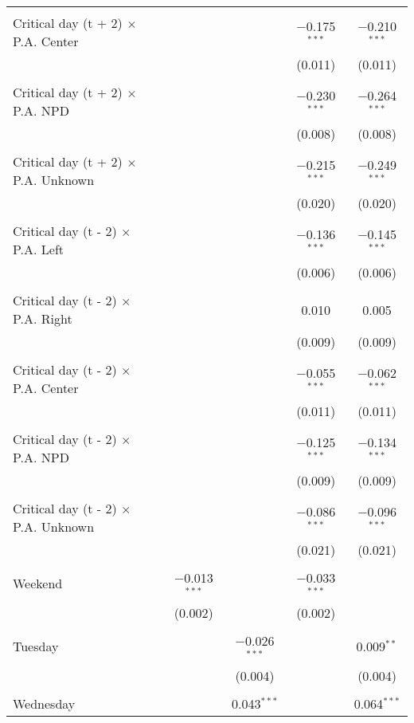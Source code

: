 \documentclass[
]{article}
\begin{document}
\begin{table}[!htbp]
{\begin{tabular}{@{\extracolsep{5pt}}lcccc}
  & & & & \\ 
 Critical day (t + 2) $\times$ P.A. Center &  &  & $-$0.175$^{***}$ & $-$0.210$^{***}$ \\ 
  &  &  & (0.011) & (0.011) \\ 
  & & & & \\ 
 Critical day (t + 2) $\times$ P.A. NPD &  &  & $-$0.230$^{***}$ & $-$0.264$^{***}$ \\ 
  &  &  & (0.008) & (0.008) \\ 
  & & & & \\ 
 Critical day (t + 2) $\times$ P.A. Unknown &  &  & $-$0.215$^{***}$ & $-$0.249$^{***}$ \\ 
  &  &  & (0.020) & (0.020) \\ 
  & & & & \\ 
 Critical day (t - 2) $\times$ P.A. Left &  &  & $-$0.136$^{***}$ & $-$0.145$^{***}$ \\ 
  &  &  & (0.006) & (0.006) \\ 
  & & & & \\ 
 Critical day (t - 2) $\times$ P.A. Right &  &  & 0.010 & 0.005 \\ 
  &  &  & (0.009) & (0.009) \\ 
  & & & & \\ 
 Critical day (t - 2) $\times$ P.A. Center &  &  & $-$0.055$^{***}$ & $-$0.062$^{***}$ \\ 
  &  &  & (0.011) & (0.011) \\ 
  & & & & \\ 
 Critical day (t - 2) $\times$ P.A. NPD &  &  & $-$0.125$^{***}$ & $-$0.134$^{***}$ \\ 
  &  &  & (0.009) & (0.009) \\ 
  & & & & \\ 
 Critical day (t - 2) $\times$ P.A. Unknown &  &  & $-$0.086$^{***}$ & $-$0.096$^{***}$ \\ 
  &  &  & (0.021) & (0.021) \\ 
  & & & & \\ 
 Weekend & $-$0.013$^{***}$ &  & $-$0.033$^{***}$ &  \\ 
  & (0.002) &  & (0.002) &  \\ 
  & & & & \\ 
 Tuesday &  & $-$0.026$^{***}$ &  & 0.009$^{**}$ \\ 
  &  & (0.004) &  & (0.004) \\ 
  & & & & \\ 
 Wednesday &  & 0.043$^{***}$ &  & 0.064$^{***}$ \\ 

\end{tabular}}
\end{table}
\end{document}
